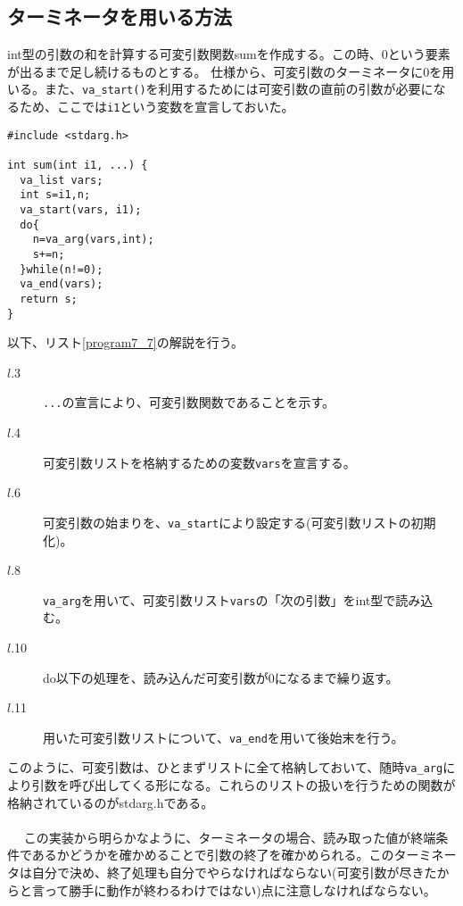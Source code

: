 \subsection{ターミネータを用いる方法}
\begin{boxnote}
\begin{multicols}{2}
int型の引数の和を計算する可変引数関数sumを作成する。この時、0という要素が出るまで足し続けるものとする。
仕様から、可変引数のターミネータに0を用いる。また、\verb|va_start()|を利用するためには可変引数の直前の引数が必要になるため、ここでは\verb|i1|という変数を宣言しておいた。
\begin{lstlisting}[caption=ターミネータ利用による総和計算関数,label=program7_7]
#include <stdarg.h> 

int sum(int i1, ...) {
  va_list vars; 
  int s=i1,n; 
  va_start(vars, i1); 
  do{
    n=va_arg(vars,int); 
    s+=n; 
  }while(n!=0); 
  va_end(vars); 
  return s; 
}
\end{lstlisting}
\end{multicols}
\end{boxnote}
以下、リスト\ref{program7_7}の解説を行う。

\begin{description}
\item[$l$.3] \verb|...|の宣言により、可変引数関数であることを示す。
\item[$l$.4] 可変引数リストを格納するための変数\verb|vars|を宣言する。
\item[$l$.6] 可変引数の始まりを、\verb|va_start|により設定する(可変引数リストの初期化)。
\item[$l$.8] \verb|va_arg|を用いて、可変引数リスト\verb|vars|の「次の引数」をint型で読み込む。
\item[$l$.10] do以下の処理を、読み込んだ可変引数が0になるまで繰り返す。
\item[$l$.11] 用いた可変引数リストについて、\verb|va_end|を用いて後始末を行う。
\end{description}

このように、可変引数は、ひとまずリストに全て格納しておいて、随時\verb|va_arg|により引数を呼び出してくる形になる。これらのリストの扱いを行うための関数が格納されているのがstdarg.hである。
\\ \\　
この実装から明らかなように、ターミネータの場合、読み取った値が終端条件であるかどうかを確かめることで引数の終了を確かめられる。このターミネータは自分で決め、終了処理も自分でやらなければならない(可変引数が尽きたからと言って勝手に動作が終わるわけではない)点に注意しなければならない。

